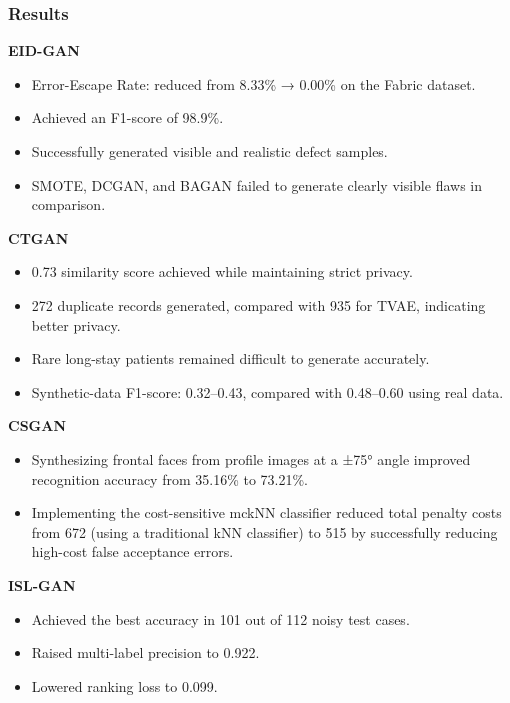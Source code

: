 \documentclass[12pt,a4paper]{article}
\begin{document}
\subsubsection{Results}
\textbf{EID-GAN}
\begin{itemize}
    \item Error-Escape Rate: reduced from 8.33\% → 0.00\% on the Fabric dataset.
    \item Achieved an F1-score of 98.9\%.
    \item Successfully generated visible and realistic defect samples.
    \item SMOTE, DCGAN, and BAGAN failed to generate clearly visible flaws in comparison.
\end{itemize}
\textbf{CTGAN}
\begin{itemize}
    \item 0.73 similarity score achieved while maintaining strict privacy.
    \item 272 duplicate records generated, compared with 935 for TVAE, indicating better privacy.
    \item Rare long-stay patients remained difficult to generate accurately.
    \item Synthetic-data F1-score: 0.32–0.43, compared with 0.48–0.60 using real data.
\end{itemize}
\textbf{CSGAN}
\begin{itemize}
    \item Synthesizing frontal faces from profile images at a ±75° angle improved recognition accuracy from 35.16\% to 73.21\%.
    \item Implementing the cost-sensitive mckNN classifier reduced total penalty costs from 672 (using a traditional kNN classifier) to 515 by successfully reducing high-cost false acceptance errors.
\end{itemize}
\textbf{ISL-GAN}
\begin{itemize}
    \item Achieved the best accuracy in 101 out of 112 noisy test cases.
    \item Raised multi-label precision to 0.922.
    \item Lowered ranking loss to 0.099.
\end{itemize}
\end{document}
